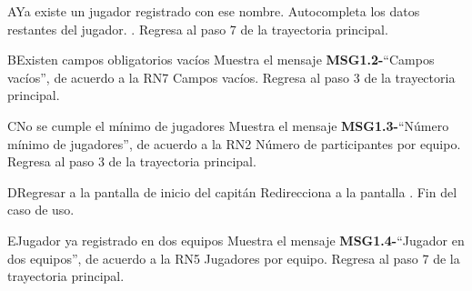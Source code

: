 \begin{UCtrayectoriaA}{A}{Ya existe un jugador registrado con ese nombre.}
	\UCpaso Autocompleta los datos restantes del jugador. .
	\UCpaso Regresa al paso 7 de la trayectoria principal.
\end{UCtrayectoriaA}

\begin{UCtrayectoriaA}{B}{Existen campos obligatorios vacíos}
		\UCpaso Muestra el mensaje {\bf MSG1.2-}``Campos vacíos'', de acuerdo a la RN7 Campos vacíos.
		\UCpaso[] Regresa al paso 3 de la trayectoria principal.
\end{UCtrayectoriaA}

\begin{UCtrayectoriaA}{C}{No se cumple el mínimo de jugadores}
	\UCpaso Muestra el mensaje {\bf MSG1.3-}``Número mínimo de jugadores'', de acuerdo a la RN2 Número de participantes por equipo.
	\UCpaso[] Regresa al paso 3 de la trayectoria principal.
\end{UCtrayectoriaA}

\begin{UCtrayectoriaA}{D}{Regresar a la pantalla de inicio del capitán}
	\UCpaso Redirecciona a la pantalla .
	\UCpaso[] Fin del caso de uso.
\end{UCtrayectoriaA}

\begin{UCtrayectoriaA}{E}{Jugador ya registrado en dos equipos}
	\UCpaso Muestra el mensaje {\bf MSG1.4-}``Jugador en dos equipos'', de acuerdo a la RN5 Jugadores por equipo.
	\UCpaso[] Regresa al paso 7 de la trayectoria principal.
\end{UCtrayectoriaA}
